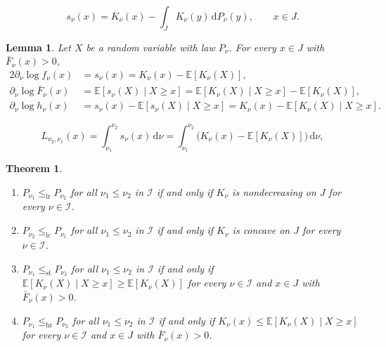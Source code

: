 \documentclass[10pt,a4paper]{amsart}
\newtheorem{lem}{Lemma}
\newtheorem{thm}{Theorem}
\newcommand{\E}{\mathbb{E}}
\newcommand{\dx}[1][x]{%
	\ensuremath{
		{\mathrm{d}}{#1}
	}
}
\newcommand{\hr}{\le_{\mathrm{hr}}}
\providecommand{\lc}{\le_{\mathrm{lc}}}
\newcommand{\lr}{\le_{\mathrm{lr}}}
\newcommand{\st}{\le_{\mathrm{st}}}
\begin{document}
\begin{equation}\label{def.log.companion}
s_\nu(x)=K_\nu(x)-\int_J K_\nu(y)\,\dx[]P_\nu(y),\qquad x\in J.
\end{equation}

\begin{lem}
\label{lem:three-levels}
Let $X$ be a random variable with law $P_\nu$. For every \(x\in J\) with \(\bar F_\nu(x)>0\),
\begin{alignat}{2}
\partial_\nu\log f_\nu(x) &=s_\nu(x)=K_\nu(x)-\E[K_\nu(X)], \label{eq:lr-kernel}\\
\partial_\nu\log\bar F_\nu(x) &=\E[s_\nu(X)\mid X\ge x]=\E[K_\nu(X)\mid X\ge x]-\E[K_\nu(X)], \label{eq:st-kernel}\\
\partial_\nu\log h_\nu(x) &=s_\nu(x)-\E[s_\nu(X)\mid X\ge x]=K_\nu(x)-\E[K_\nu(X)\mid X\ge x]. \label{eq:hr-kernel}
\end{alignat}
\end{lem}

\begin{equation}\label{eq:pair-density-int}
L_{\nu_2,\nu_1}(x) =\int_{\nu_1}^{\nu_2}s_\nu(x)\,\dx[\nu] =\int_{\nu_1}^{\nu_2} \bigl(K_\nu(x)-\E[K_\nu(X)]\bigr)\,\dx[\nu],
\end{equation}

\begin{thm}
\label{thm:four-criteria}
\leavevmode
\begin{enumerate}[label=\textup{(\roman*)}]
\item \(P_{\nu_1}\lr P_{\nu_2}\) for all \(\nu_1\le\nu_2\) in \(\mathcal I\) if and only if \(K_\nu\) is nondecreasing on \(J\) for every \(\nu\in\mathcal I\).

\item \(P_{\nu_2}\lc P_{\nu_1}\) for all \(\nu_1\le\nu_2\) in \(\mathcal I\) if and only if \(K_\nu\) is concave on \(J\) for every \(\nu\in\mathcal I\).

\item \(P_{\nu_1}\st P_{\nu_2}\) for all \(\nu_1\le\nu_2\) in \(\mathcal I\) if and only if \(\E[K_\nu(X)\mid X\ge x]\ge\E[K_\nu(X)]\) for every \(\nu\in\mathcal I\) and \(x\in J\) with \(\bar F_\nu(x)>0\).

\item \(P_{\nu_1}\hr P_{\nu_2}\) for all \(\nu_1\le\nu_2\) in \(\mathcal I\) if and only if \(K_\nu(x)\le\E[K_\nu(X)\mid X\ge x]\) for every \(\nu\in\mathcal I\) and \(x\in J\) with \(\bar F_\nu(x)>0\).
\end{enumerate}
\end{thm}
\end{document}
